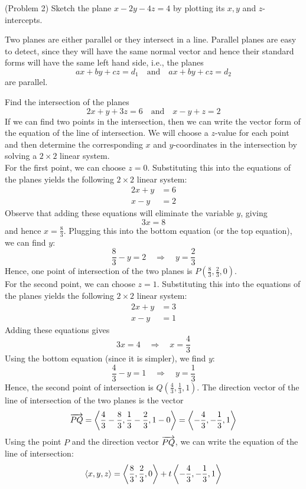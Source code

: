 \documentclass[handout]{ximera}
\begin{document}
\begin{problem}(Problem 2)
Sketch the plane $x - 2y - 4z = 4$ by plotting its $x, y$ and $z$-intercepts.
\end{problem}

Two planes are either parallel or they intersect in a line.
Parallel planes are easy to detect, since they will have the same normal vector and hence their standard forms
will have the same left hand side, i.e., the planes
\[
ax+by+cz = d_1 \quad \text{and} \quad ax+by+cz = d_2
\]
are parallel.


\begin{example}[Example 3]
Find the intersection of the planes 
\[
2x + y + 3z = 6 \quad \text{and} \quad x - y + z = 2
\]
If we can find two points in the intersection, then we can write the vector form of the equation of the line of intersection.
We will choose a $z$-value for each point and then determine the corresponding $x$ and $y$-coordinates in the 
intersection by solving a $2 \times 2$ linear system.\\
For the first point, we can choose $z = 0$. Substituting this into the equations of the planes yields the
following $2 \times 2$ linear system:
\begin{align*}
2x+y &= 6\\
x -y &= 2
\end{align*}
Observe that adding these equations will eliminate the variable $y$,  giving
\[
3x = 8
\]
and hence $x = \frac83$.  Plugging this into the bottom equation (or the top equation), we can find $y$:
\[
 \frac83 -y = 2 \quad \Rightarrow \quad y = \frac23
\]
Hence, one point of intersection of the two planes is $P\left(\frac83, \frac23, 0\right)$.\\
For the second point, we can choose $z = 1$. Substituting this into the equations of the planes yields the 
following $2 \times 2$ linear system:
\begin{align*}
2x + y &= 3\\
x - y &= 1
\end{align*}
Adding these equations gives
\[
3x = 4 \quad \Rightarrow \quad x = \frac43
\]
Using the bottom equation (since it is simpler), we find $y$:
\[
\frac43 - y = 1 \quad \Rightarrow \quad y = \frac13
\]
Hence, the second point of intersection is $Q\left(\frac43, \frac13, 1\right)$.
The direction vector of the line of intersection of the two planes is the vector
\[
\overrightarrow{PQ} = \left\langle \frac43 - \frac83, \frac13 - \frac23, 1-0\right\rangle = \left\langle -\frac43, -\frac13, 1\right\rangle
\]
Using the point $P$ and the direction vector $\overrightarrow{PQ}$, we can write the equation of the line of intersection:
\[
\left\langle x, y, z\right\rangle = \left\langle \frac83, \frac23, 0\right\rangle + t \left\langle -\frac43, -\frac13, 1\right\rangle
\]

\end{example}
\end{document}
